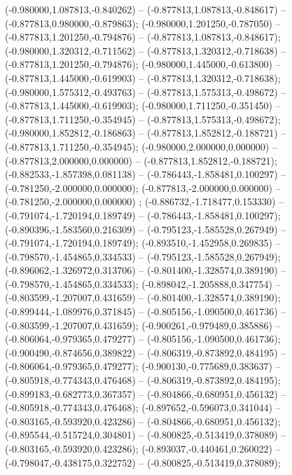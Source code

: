  (-0.980000,1.087813,-0.840262) -- (-0.877813,1.087813,-0.848617) -- (-0.877813,0.980000,-0.879863);
 (-0.980000,1.201250,-0.787050) -- (-0.877813,1.201250,-0.794876) -- (-0.877813,1.087813,-0.848617);
 (-0.980000,1.320312,-0.711562) -- (-0.877813,1.320312,-0.718638) -- (-0.877813,1.201250,-0.794876);
 (-0.980000,1.445000,-0.613800) -- (-0.877813,1.445000,-0.619903) -- (-0.877813,1.320312,-0.718638);
 (-0.980000,1.575312,-0.493763) -- (-0.877813,1.575313,-0.498672) -- (-0.877813,1.445000,-0.619903);
 (-0.980000,1.711250,-0.351450) -- (-0.877813,1.711250,-0.354945) -- (-0.877813,1.575313,-0.498672);
 (-0.980000,1.852812,-0.186863) -- (-0.877813,1.852812,-0.188721) -- (-0.877813,1.711250,-0.354945);
 (-0.980000,2.000000,0.000000) -- (-0.877813,2.000000,0.000000) -- (-0.877813,1.852812,-0.188721);
 (-0.882533,-1.857398,0.081138) -- (-0.786443,-1.858481,0.100297) -- (-0.781250,-2.000000,0.000000);
 (-0.877813,-2.000000,0.000000) -- (-0.781250,-2.000000,0.000000) ;
 (-0.886732,-1.718477,0.153330) -- (-0.791074,-1.720194,0.189749) -- (-0.786443,-1.858481,0.100297);
 (-0.890396,-1.583560,0.216309) -- (-0.795123,-1.585528,0.267949) -- (-0.791074,-1.720194,0.189749);
 (-0.893510,-1.452958,0.269835) -- (-0.798570,-1.454865,0.334533) -- (-0.795123,-1.585528,0.267949);
 (-0.896062,-1.326972,0.313706) -- (-0.801400,-1.328574,0.389190) -- (-0.798570,-1.454865,0.334533);
 (-0.898042,-1.205888,0.347754) -- (-0.803599,-1.207007,0.431659) -- (-0.801400,-1.328574,0.389190);
 (-0.899444,-1.089976,0.371845) -- (-0.805156,-1.090500,0.461736) -- (-0.803599,-1.207007,0.431659);
 (-0.900261,-0.979489,0.385886) -- (-0.806064,-0.979365,0.479277) -- (-0.805156,-1.090500,0.461736);
 (-0.900490,-0.874656,0.389822) -- (-0.806319,-0.873892,0.484195) -- (-0.806064,-0.979365,0.479277);
 (-0.900130,-0.775689,0.383637) -- (-0.805918,-0.774343,0.476468) -- (-0.806319,-0.873892,0.484195);
 (-0.899183,-0.682773,0.367357) -- (-0.804866,-0.680951,0.456132) -- (-0.805918,-0.774343,0.476468);
 (-0.897652,-0.596073,0.341044) -- (-0.803165,-0.593920,0.423286) -- (-0.804866,-0.680951,0.456132);
 (-0.895544,-0.515724,0.304801) -- (-0.800825,-0.513419,0.378089) -- (-0.803165,-0.593920,0.423286);
 (-0.893037,-0.440461,0.260022) -- (-0.798047,-0.438175,0.322752) -- (-0.800825,-0.513419,0.378089);
